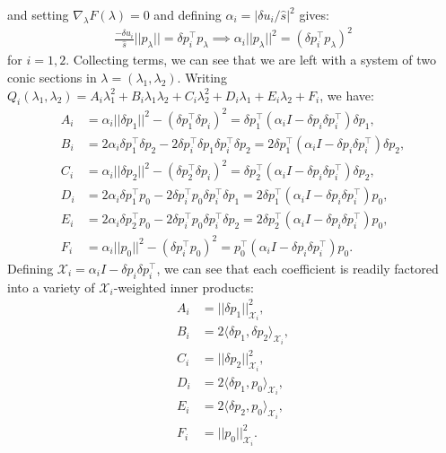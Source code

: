 \documentclass{article}
\theoremstyle{definition}
\begin{document}
and setting $\nabla_\lambda F(\lambda) = 0$ and defining
$\alpha_i = |\delta u_i/\hat{s}|^2$ gives:
\begin{align*}
  \frac{-\delta u_i}{\hat{s}} ||p_\lambda|| = \delta p_i^\top p_\lambda \implies \alpha_i ||p_\lambda||^2 = {(\delta p_i^\top p_\lambda)}^2
\end{align*}
for $i = 1, 2$. Collecting terms, we can see that we are left with a
system of two conic sections in $\lambda = (\lambda_1,
\lambda_2)$. Writing
$Q_i(\lambda_1, \lambda_2) = A_i \lambda_1^2 + B_i \lambda_1 \lambda_2 + C_i \lambda_2^2 + D_i
\lambda_1 + E_i \lambda_2 + F_i$, we have:
\begin{align*}
  A_i &= \alpha_i ||\delta p_1||^2 - {(\delta p_1^\top \delta p_i)}^2 = \delta p_1^\top {(\alpha_i I - \delta p_i \delta p_i^\top)} \delta p_1, \\
  B_i &= 2 \alpha_i \delta p_1^\top \delta p_2 - 2 \delta p_i^\top \delta p_1 \delta p_i^\top \delta p_2 = 2 \delta p_1^\top {(\alpha_i I - \delta p_i \delta p_i^\top)} \delta p_2, \\
  C_i &= \alpha_i ||\delta p_2||^2 - {(\delta p_2^\top \delta p_i)}^2 = \delta p_2^\top {(\alpha_i I - \delta p_i \delta p_i^\top)} \delta p_2, \\
  D_i &= 2 \alpha_i \delta p_1^\top p_0 - 2 \delta p_i^\top p_0 \delta p_i^\top \delta p_1 = 2 \delta p_1^\top {(\alpha_i I - \delta p_i \delta p_i^\top)} p_0, \\
  E_i &= 2 \alpha_i \delta p_2^\top p_0 - 2 \delta p_i^\top p_0 \delta p_i^\top \delta p_2 = 2 \delta p_2^\top {(\alpha_i I - \delta p_i \delta p_i^\top)} p_0, \\
  F_i &= \alpha_i ||p_0||^2 - {(\delta p_i^\top p_0)}^2 = p_0^\top {(\alpha_i I - \delta p_i \delta p_i^\top)} p_0.
\end{align*}
Defining $\mathcal{X}_i = \alpha_i I - \delta p_i \delta p_i^\top$, we
can see that each coefficient is readily factored into a variety of
$\mathcal{X}_i$-weighted inner products:
\begin{align*}
  A_i &= ||\delta p_1||_{\mathcal{X}_i}^2, \\
  B_i &= 2 \langle \delta p_1, \delta p_2 \rangle_{\mathcal{X}_i}, \\
  C_i &= ||\delta p_2||_{\mathcal{X}_i}^2, \\
  D_i &= 2 \langle \delta p_1, p_0 \rangle_{\mathcal{X}_i}, \\
  E_i &= 2 \langle \delta p_2, p_0 \rangle_{\mathcal{X}_i}, \\
  F_i &= ||p_0||_{\mathcal{X}_i}^2.
\end{align*}
\end{document}
